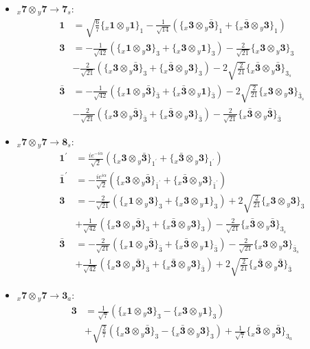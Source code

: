 \documentclass[english]{article}
\newcommand{\rep}[1]{\mathbf{#1}}
\newcommand{\repx}[2]{{}_{#2}\mathbf{#1}}
\newcommand{\tsprodx}[2]{\repx{#1}{x}\otimes\repx{#2}{y}}
\newcommand{\subcgt}[3]{\big\{ \tsprodx{#1}{#2}\big\}^{}_{#3}}
\begin{document}
\begin{itemize}
\item $\tsprodx{7}{7}\to\rep{7}_{s}$:
\begin{align*}
\rep{1} & = \sqrt{\frac{6}{7}}\subcgt{1}{1}{1}-\frac{1}{\sqrt{14}}\left(\subcgt{3}{\bar{3}}{1}+\subcgt{\bar{3}}{3}{1}\right)
\\
\rep{3} & = -\frac{1}{\sqrt{42}}\left(\subcgt{1}{3}{3}+\subcgt{3}{1}{3}\right)-\frac{2}{\sqrt{21}}\subcgt{3}{3}{3} \\ 
 & -\frac{2}{\sqrt{21}}\left(\subcgt{3}{\bar{3}}{3}+\subcgt{\bar{3}}{3}{3}\right)-2 \sqrt{\frac{2}{21}}\subcgt{\bar{3}}{\bar{3}}{3_{s}}
\\
\rep{\bar{3}} & = -\frac{1}{\sqrt{42}}\left(\subcgt{1}{\bar{3}}{\bar{3}}+\subcgt{\bar{3}}{1}{\bar{3}}\right)-2 \sqrt{\frac{2}{21}}\subcgt{3}{3}{\bar{3}_{s}} \\ 
 & -\frac{2}{\sqrt{21}}\left(\subcgt{3}{\bar{3}}{\bar{3}}+\subcgt{\bar{3}}{3}{\bar{3}}\right)-\frac{2}{\sqrt{21}}\subcgt{\bar{3}}{\bar{3}}{\bar{3}}
\end{align*}
\item $\tsprodx{7}{7}\to\rep{8}_{s}$:
\begin{align*}
\rep{1^{\prime}} & = \frac{i e^{-i \alpha }}{\sqrt{2}}\left(\subcgt{3}{\bar{3}}{1^{\prime}}+\subcgt{\bar{3}}{3}{1^{\prime}}\right)
\\
\rep{\bar{1}^{\prime}} & = -\frac{i e^{i \alpha }}{\sqrt{2}}\left(\subcgt{3}{\bar{3}}{\bar{1}^{\prime}}+\subcgt{\bar{3}}{3}{\bar{1}^{\prime}}\right)
\\
\rep{3} & = -\frac{2}{\sqrt{21}}\left(\subcgt{1}{3}{3}+\subcgt{3}{1}{3}\right)+2 \sqrt{\frac{2}{21}}\subcgt{3}{3}{3} \\ 
 & +\frac{1}{\sqrt{42}}\left(\subcgt{3}{\bar{3}}{3}+\subcgt{\bar{3}}{3}{3}\right)-\frac{2}{\sqrt{21}}\subcgt{\bar{3}}{\bar{3}}{3_{s}}
\\
\rep{\bar{3}} & = -\frac{2}{\sqrt{21}}\left(\subcgt{1}{\bar{3}}{\bar{3}}+\subcgt{\bar{3}}{1}{\bar{3}}\right)-\frac{2}{\sqrt{21}}\subcgt{3}{3}{\bar{3}_{s}} \\ 
 & +\frac{1}{\sqrt{42}}\left(\subcgt{3}{\bar{3}}{\bar{3}}+\subcgt{\bar{3}}{3}{\bar{3}}\right)+2 \sqrt{\frac{2}{21}}\subcgt{\bar{3}}{\bar{3}}{\bar{3}}
\end{align*}
\item $\tsprodx{7}{7}\to\rep{3}_{a}$:
\begin{align*}
\rep{3} & = \frac{1}{\sqrt{7}}\left(\subcgt{1}{3}{3}-\subcgt{3}{1}{3}\right) \\ 
 & +\sqrt{\frac{2}{7}}\left(\subcgt{3}{\bar{3}}{3}-\subcgt{\bar{3}}{3}{3}\right)+\frac{1}{\sqrt{7}}\subcgt{\bar{3}}{\bar{3}}{3_{a}}

\end{align*}
\end{itemize}
\end{document}
